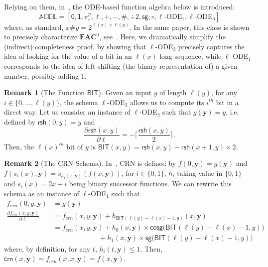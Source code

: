 \documentclass[11pt, oneside]{article}
\newcommand{\ACDL}{\mathbb{ACDL}}
\newcommand{\fun}[1]{\mathsf{#1}}
\newcommand{\AC}{\mathbf{FAC}}
\newcommand{\tu}[1]{\mathbf{#1}}
\theoremstyle{definition}
\newtheorem{remark}{Remark}
\begin{document}
\noindent
Relying on them, in~\cite{ADK24a}, the ODE-based function algebra below is introduced:
$$
\ACDL =
[\fun{0}, \fun{1}, \pi^p_i, \ell, +, -, \#, \div 2, \fun{sg}; \circ, \ell\text{-ODE}_1, \ell\text{-ODE}_3]
$$
where, as standard, $x \# y = 2^{\ell(x)\times \ell(y)}$.
In the same paper, this class is shown to precisely characterize $\AC^0$, see~\cite[Cor. 19]{ADK24a}.
%
Here, we dramatically simplify the (indirect) completeness proof, by showing that  $\ell$-ODE$_3$ precisely captures the idea of looking for the value of a bit in an $\ell(x)$ long sequence, while $\ell$-ODE$_1$ corresponds to the idea of left-shifting (the binary representation of) a given number, possibly adding 1.

\begin{remark}[The Function $\fun{BIT}$]\label{remark:BIT}
    Given an input $y$ of length %
    $\ell(y)$, for any $i\in \{0,\dots, \ell(y)\}$, the schema $\ell$-ODE$_3$ allows us to compute its $i^{th}$ bit in a direct way.
    Let us consider an instance of $\ell$-ODE$_3$ such that $g(\tu y)=y$, i.e. defined by $\fun{rsh}(0, y)=y$ and
    $$
    \frac{\partial \fun{rsh}(x,y)}{\partial \ell} = - \bigg\lceil \frac{ \fun{rsh}(x, y)}{2}\bigg\rceil.
    $$
    Then, the $\ell(x)^{th}$ bit of $y$ is $\fun{BIT}(x, y)=\fun{rsh}(x,y)-\fun{rsh}(x+1, y) \times 2$.
\end{remark}



\begin{remark}[The CRN Schema]\label{remark:CRN}
    In~\cite{Clote1990}, CRN is defined by $f(0, \tu y)=g(\tu y)$ and $f(s_i(x), \tu y)=s_{h_i(x,\tu y)}(f(x, \tu y))$, for $i\in \{0,1\}$, $h_i$ taking value in $\{0,1\}$ and $s_i(x)=2x+i$ being binary successor functions.
    We can rewrite this schema 
    as an instance of
    $\ell$-ODE$_1$ such that %
    \small
    \begin{align*}
        f_{crn}(0, y, \tu y) &= g(\tu y) \\
        \frac{\partial f_{crn}(x, y, \tu y)}{\partial \ell} &= f_{crn}(x,y,\tu y) + h_{\fun{BIT}(\ell(y)-\ell(x)-1,y)}(x, \tu y) \\
        &= f_{crn}(x,y,\tu y) +   h_0(x, \tu y) \times \fun{cosg}\big(\fun{BIT}(\ell(y)-\ell(x)-1, y)\big) \\
        & \quad \quad \quad \quad \quad \quad \; \; + h_1(x, \tu y) \times \fun{sg}\big(\fun{BIT}(\ell(y)-\ell(x)-1, y)\big)
    \end{align*}
    \normalsize
    where, by definition, for any $t$, $h_i(t,\tu y) \leq 1$.
    Then, $\fun{crn}(x,\tu y)=f_{crn}(x,x,\tu y)=f(x, \tu y)$.
\end{remark}
\end{document}
